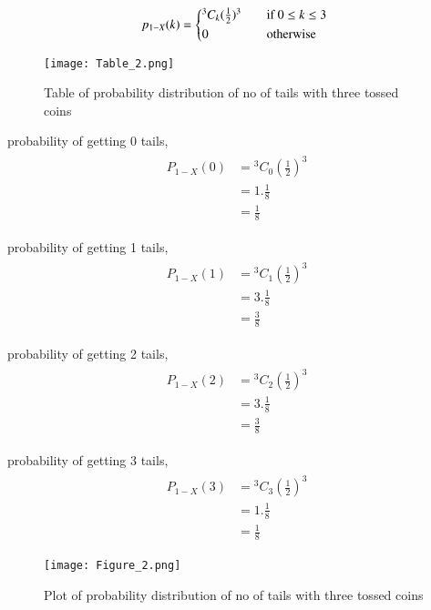 \documentclass[journal,12pt,twocolumn]{IEEEtran}
\begin{document}
\begin{align}
   p_{1-X}(k) =
  \begin{cases*}
    {^3 C_k}(\frac{1}{2})^{3} \quad& if $0 \leq k \leq 3$ \\
    0 \quad& otherwise
  \end{cases*}
\end{align}

\begin{figure}[h!]
    \centering
    \texttt{[image: Table\_2.png]}
    \caption{Table of probability distribution of no of tails with three tossed coins}
    \label{fig:Table_2}
\end{figure}

probability of getting 0 tails,
\begin{align}
    \begin{split}
    P_{1-X}(0) &= {^3C_0}(\frac{1}{2})^3\\
    &=1.\frac{1}{8}\\
    &=\frac{1}{8}
    \end{split}
\end{align}

probability of getting 1 tails,
\begin{align}
    \begin{split}
    P_{1-X}(1) &= {^3C_1}(\frac{1}{2})^3\\
    &=3.\frac{1}{8}\\
    &=\frac{3}{8}
    \end{split}
\end{align}

probability of getting 2 tails,
\begin{align}
    \begin{split}
    P_{1-X}(2) &= {^3C_2}(\frac{1}{2})^3\\
    &=3.\frac{1}{8}\\
    &=\frac{3}{8}
    \end{split}
\end{align}

probability of getting 3 tails,
\begin{align}
    \begin{split}
    P_{1-X}(3) &= {^3C_3}(\frac{1}{2})^3\\
    &=1.\frac{1}{8}\\
    &=\frac{1}{8}
    \end{split}
\end{align}

\begin{figure}[h!]
    \centering
    \texttt{[image: Figure\_2.png]}
    \caption{Plot of probability distribution of no of tails with three tossed coins}
    \label{fig:Three coins}
\end{figure}
\end{document}
